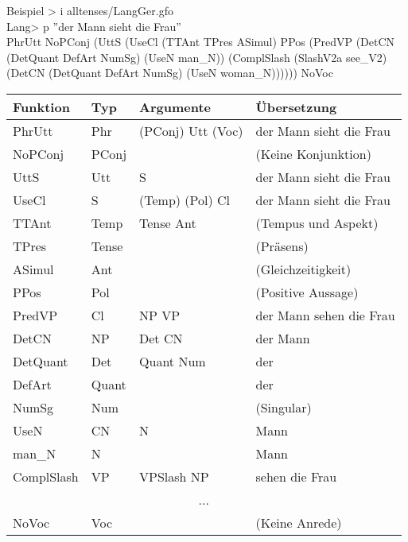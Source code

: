 \documentclass{beamer}
\begin{document}
\begin{frame}

\begin{block}{Beispiel}
{\scriptsize\ttfamily
> i alltenses/LangGer.gfo \\
Lang> p ''der Mann sieht die Frau'' \\
PhrUtt NoPConj (UttS (UseCl (TTAnt TPres ASimul) PPos (PredVP (DetCN (DetQuant DefArt NumSg) (UseN man\_N)) (ComplSlash (SlashV2a see\_V2) (DetCN (DetQuant DefArt NumSg) (UseN woman\_N)))))) NoVoc
}
\end{block}
{\tiny
\begin{center}
\begin{tabular}{|l|l|l|l|}
\hline
Funktion & Typ & Argumente & Übersetzung\\
\hline
PhrUtt & Phr & (PConj) Utt (Voc) & der Mann sieht die Frau \\
NoPConj & PConj &  & (Keine Konjunktion) \\
UttS & Utt & S & der Mann sieht die Frau \\
UseCl & S & (Temp) (Pol) Cl & der Mann sieht die Frau \\
TTAnt & Temp & Tense Ant & (Tempus und Aspekt) \\
TPres & Tense & & (Präsens) \\
ASimul & Ant & & (Gleichzeitigkeit) \\
PPos & Pol & & (Positive Aussage) \\
PredVP & Cl & NP VP & der Mann sehen die Frau \\
DetCN & NP & Det CN & der Mann \\
DetQuant & Det & Quant Num & der \\
DefArt & Quant & & der \\
NumSg & Num & & (Singular) \\
UseN & CN & N & Mann \\
man\_N & N & & Mann \\
ComplSlash & VP & VPSlash NP & sehen die Frau \\
\multicolumn{4}{|c|}{...} \\
NoVoc & Voc & & (Keine Anrede) \\
\hline
\end{tabular}
\end{center}
}
\end{frame}
\end{document}
